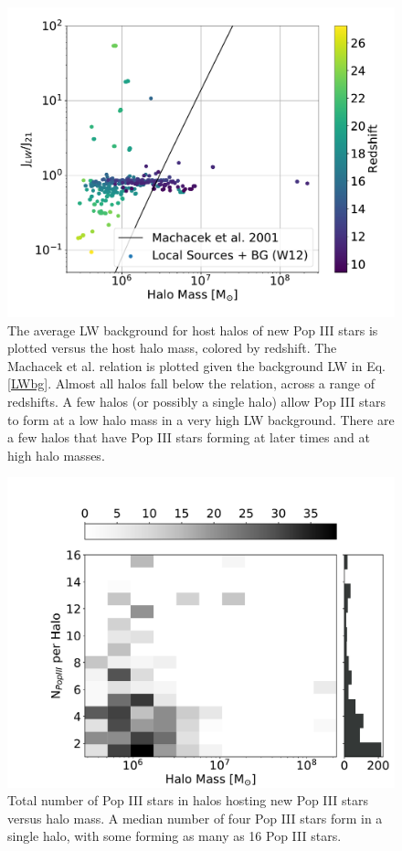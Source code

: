 \documentclass[a4paper,fleqn,usenatbib]{mnras}
\begin{document}
\begin{figure}
	\includegraphics[width=\columnwidth]{images/jlw_mass_machacek_total.pdf}
    \caption{The average LW background for host halos of new Pop III stars is plotted versus the host halo mass, colored by redshift. The Machacek et al. relation is plotted given the background LW in Eq. \ref{LWbg}. Almost all halos fall below the relation, across a range of redshifts. A few halos (or possibly a single halo) allow Pop III stars to form at a low halo mass in a very high LW background. There are a few halos that have Pop III stars forming at later times and at high halo masses.}
    \label{fig:jlw_mass_machacek}{}
\end{figure}

\begin{figure}
	\includegraphics[width=\columnwidth]{images/totnump3_halomass_sidehist.pdf}
    \caption{Total number of Pop III stars in halos hosting new Pop III stars versus halo mass. A median number of four Pop III stars form in a single halo, with some forming as many as 16 Pop III stars.}
    \label{fig:totnump3_halomass_sidehist}
\end{figure}
\end{document}
